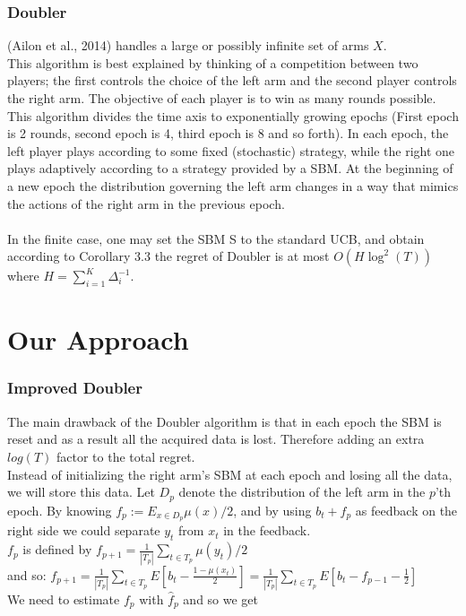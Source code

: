 \documentclass{llncs}
\begin{document}
	\subsubsection{Doubler}
(Ailon et al., 2014) handles a large or possibly infinite set of arms $X$. 
\\
This algorithm is best explained by thinking of a competition between
two players; the first controls the choice of the left arm and
the second player controls the right arm. The objective of each
player is to win as many rounds possible.
\\
This algorithm divides the time axis to exponentially growing epochs (First epoch is 2 rounds, second epoch is 4, third epoch is 8 and so forth).
In each epoch, the left player plays according to some fixed
(stochastic) strategy, while the right one plays adaptively according to a strategy provided by a SBM. At the beginning of a new epoch the distribution governing the left arm changes in a way that mimics the actions of the right arm in the previous epoch.\\
			
		\\
		In the finite case, one may set the SBM S to the standard
UCB, and obtain according to Corollary 3.3 the regret of Doubler is at most $O(H \log^2 (T))$ where $H=\sum_{i=1}^K \Delta^{-1}_i$.
\newpage

\section{Our Approach}	
		
	\subsubsection{Improved Doubler}
	The main drawback of the Doubler algorithm is that in each epoch the SBM is reset and as a result all the acquired data is lost. Therefore adding an extra $log(T)$ factor to the total regret.\\
	Instead of initializing the right arm’s SBM at each epoch and losing all the data, we will store this data.
Let $D_p$ denote the distribution of the left arm in the $p$’th epoch. 
By knowing $f_p := E_{x\in D_p} \mu(x)/2$, and by using $b_t + f_p$ as feedback on the right side we could separate $y_t$ from $x_t$ in the feedback.
\\
		
		
		$f_p$ is defined by $f_{p+1} = 
		\frac{1}{|T_p|}\sum\limits_{t\in T_p} \mu(y_t)/2$\\
		and so: $f_{p+1} = 
		\frac{1}{|T_p|}\sum\limits_{t\in T_p} E[b_t - \frac{1-\mu(x_t)}{2}] = \frac{1}{|T_p|}\sum\limits_{t\in T_p} E[b_t - f_{p-1}-\frac{1}{2}]$ \\
		We need to estimate $f_p$ with $\hat{f}_p$ and so we get
\end{document}
